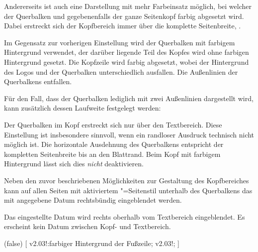 \begin{DeclareEntity*}{}
\begin{DeclareEntity*}{}
\begin{DeclareEntity*}{}
\begin{Declaration}
Andererseits ist auch eine Darstellung mit mehr Farbeinsatz möglich, bei 
welcher der Querbalken und gegebenenfalls der ganze Seitenkopf farbig 
abgesetzt wird. Dabei erstreckt sich der Kopfbereich immer über die komplette 
Seitenbreite, .
%
\begin{DeclareValues}{}
  Im Gegensatz zur vorherigen Einstellung wird der Querbalken mit farbigem 
  Hintergrund verwendet, der darüber liegende Teil des Kopfes wird ohne 
  farbigen Hintergrund gesetzt.
  Die Kopfzeile wird farbig abgesetzt, wobei der Hintergrund des Logos und der 
  Querbalken unterschiedlich ausfallen. Die Außenlinien der Querbalkens 
  entfallen.
\end{DeclareValues}

Für den Fall, dass der Querbalken lediglich mit zwei Außenlinien dargestellt 
wird, kann zusätzlich dessen Laufweite festgelegt werden:
%
\begin{DeclareValues}{}
  Der Querbalken im Kopf erstreckt sich nur über den Textbereich. Diese 
  Einstellung ist insbesondere sinnvoll, wenn ein randloser Ausdruck technisch 
  nicht möglich ist. 
  Die horizontale Ausdehnung des Querbalkens entspricht der kompletten 
  Seitenbreite bis an den Blattrand. Beim Kopf mit farbigem Hintergrund lässt 
  sich dies \emph{nicht} deaktivieren.
\end{DeclareValues}

%
Neben den zuvor beschriebenen Möglichkeiten zur Gestaltung des Kopfbereiches 
kann auf allen Seiten mit aktiviertem "=Seitenstil 
unterhalb des Querbalkens das mit  angegebene Datum rechtsbündig 
eingeblendet werden.
%
\begin{DeclareValues}[Datum]{}
  Das eingestellte Datum wird rechts oberhalb vom Textbereich eingeblendet.
  Es erscheint kein Datum zwischen Kopf- und Textbereich.
\end{DeclareValues}
\end{Declaration}

\begin{Declaration}
  {}
  (false)
[%
  v2.03!:farbiger Hintergrund der Fußzeile;%
  v2.03!;%
]


\end{Declaration}
\end{DeclareEntity*}
\end{DeclareEntity*}
\end{DeclareEntity*}

